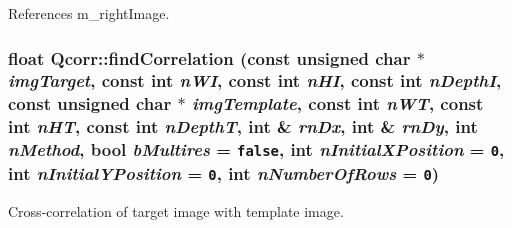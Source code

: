 References m\_\-rightImage.\hypertarget{classQcorr_05dcc1b0be4596b355df235264180da4}{
\subsubsection[{findCorrelation}]{\setlength{\rightskip}{0pt plus 5cm}float Qcorr::findCorrelation (const unsigned char $\ast$ {\em imgTarget}, \/  const int {\em nWI}, \/  const int {\em nHI}, \/  const int {\em nDepthI}, \/  const unsigned char $\ast$ {\em imgTemplate}, \/  const int {\em nWT}, \/  const int {\em nHT}, \/  const int {\em nDepthT}, \/  int \& {\em rnDx}, \/  int \& {\em rnDy}, \/  int {\em nMethod}, \/  bool {\em bMultires} = {\tt false}, \/  int {\em nInitialXPosition} = {\tt 0}, \/  int {\em nInitialYPosition} = {\tt 0}, \/  int {\em nNumberOfRows} = {\tt 0})}}
\label{classQcorr_05dcc1b0be4596b355df235264180da4}


Cross-correlation of target image with template image. 

